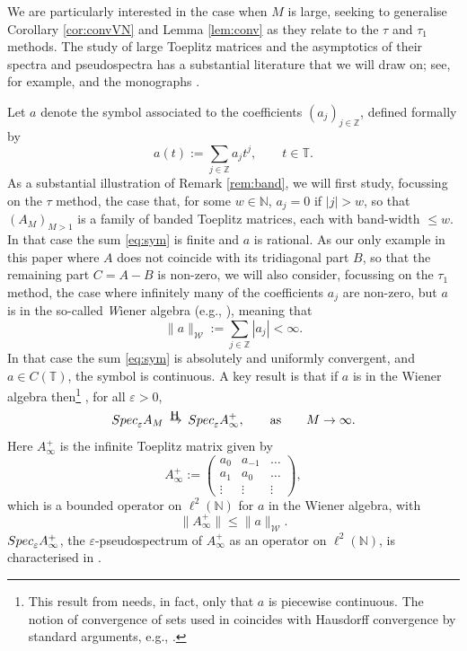 \documentclass[preprint,1p,11pt]{elsarticle}
\newcommand\N{{\mathbb N}}
\newcommand\T{{\mathbb T}}
\newcommand\Z{{\mathbb Z}}
\newcommand\eps{{\varepsilon}}
\newcommand\Speps{{\rm Spec}_\eps}
\newcommand\Hto{
   \unitlength0.1ex
   \begin{picture}(30,15)
   \put(13,16){\makebox(0,0)[]{\tiny\rm H}}
   \put(15,5){\makebox(0,0)[]{$\to$}}
   \end{picture}
}
\numberwithin{equation}{section}   %
\numberwithin{figure}{section}  %
\begin{document}
We are particularly interested in the case when $M$ is large, seeking to generalise Corollary \ref{cor:convVN} and Lemma \ref{lem:conv} as they relate to the $\tau$ and $\tau_1$ methods. The study of large Toeplitz  matrices and the asymptotics of their spectra and pseudospectra has a substantial literature that we will draw on; see, for example, \cite{ReichelTref} and the monographs \cite{BoeGru,BoeSi2,TrefEmbBook}.

Let $a$ denote the symbol associated to the coefficients $(a_j)_{j\in \Z}$, defined formally by
\begin{equation} \label{eq:sym}
a(t) := \sum_{j\in \Z} a_j t^j, \qquad t\in \T.
\end{equation}
As a substantial illustration of Remark \ref{rem:band}, we will first study, focussing on the $\tau$ method,  the case that, for some $w\in \N$, $a_j=0$ if $|j|>w$, so that $(A_M)_{M>1}$ is a family of banded Toeplitz matrices, each with band-width $\leq w$. In that case the sum \eqref{eq:sym} is finite and $a$ is rational. As our only example in this paper where $A$ does not coincide with its tridiagonal part $B$, so that the remaining part $C=A-B$ is non-zero, we will also consider, focussing on the $\tau_1$ method, the case where infinitely many of the coefficients $a_j$ are non-zero, but $a$ is in the so-called {\emph Wiener algebra} (e.g., \cite[Example 1.5]{BoeSi2}), meaning that
\begin{equation} \label{eq:wiener}
\|a\|_{\mathcal{W}} := \sum_{j\in \Z} |a_j| <\infty.
\end{equation}
In that case the sum \eqref{eq:sym} is absolutely and uniformly convergent, and $a\in C(\T)$, the symbol is continuous. A key result is that if $a$ is in the Wiener algebra then\footnote{This result from \cite{BoeSi2} needs, in fact, only that $a$ is piecewise continuous. The notion of convergence of sets used in \cite[Corollary 3.18]{BoeSi2} coincides with Hausdorff convergence by standard arguments, e.g., \cite[Proposition 3.6]{HaRoSi2}.} \cite[Corollary 3.18]{BoeSi2}, for all $\eps>0$,
\begin{equation} \label{eq:Toep}
\Speps A_M\ \Hto\ \Speps A_\infty^{+}, \qquad \mbox{as} \qquad M\to\infty.
\end{equation}
Here $A_\infty^{+}$ is the infinite Toeplitz matrix given by
$$
A_\infty^{+} := \left(\begin{array}{ccc} a_0 &a_{-1} &\ldots \\
a_1 & a_0 &\ldots\\
\vdots &\vdots & \vdots
\end{array}\right),
$$
which is a bounded operator on $\ell^2(\N)$ for $a$ in the Wiener algebra, with
$$
\|A_\infty^{+}\| \leq \|a\|_{\mathcal{W}}.
$$ 
$\Speps A_\infty^{+}$, the $\eps$-pseudospectrum of $A_\infty^{+}$ as an operator on $\ell^2(\N)$, is characterised in \cite[\S3.6]{BoeSi2}. 
\end{document}
